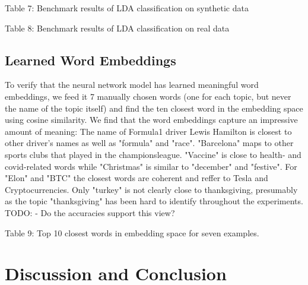 \documentclass[11pt]{article}
\begin{document}
\begin{center}

\qquad

\end{center}
\begin{center}
Table 7: Benchmark results of LDA classification on synthetic data

Table 8: Benchmark results of LDA classification on real data

\end{center}

\subsection{Learned Word Embeddings}
To verify that the neural network model has learned meaningful word embeddings, we feed it 7 manually chosen words (one for each topic, but never the name of the topic itself) and find the ten closest word in the embedding space using cosine similarity. We find that the word embeddings capture an impressive amount of meaning: The name of Formula1 driver Lewis Hamilton is closest to other driver's names as well as "formula" and "race". "Barcelona" maps to other sports clubs that played in the championsleague. "Vaccine" is close to health- and covid-related words while "Christmas" is similar to "december" and "festive". For "Elon" and "BTC" the closest words are coherent and reffer to Tesla and Cryptocurrencies. Only "turkey" is not clearly close to thanksgiving, presumably as the topic "thanksgiving" has been hard to identify throughout the experiments.
TODO:
- Do the accuracies support this view?


\begin{adjustbox}{width=\columnwidth,center}

\end{adjustbox}
\begin{center}
	Table 9: Top 10 closest words in embedding space for seven examples.
\end{center}

\section{Discussion and Conclusion}



\newpage
\printbibliography
\end{document}
